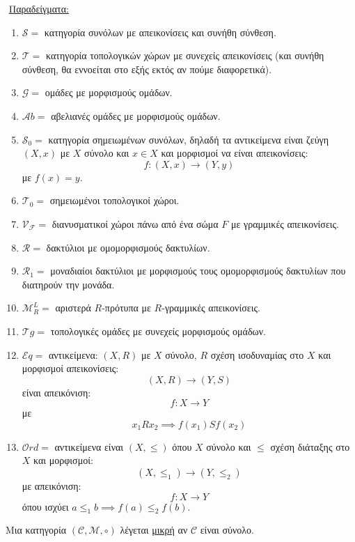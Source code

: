 $ $\newline
\underline{Παραδείγματα:}
\begin{enumerate}
    \item $\mathcal{S} =$ κατηγορία συνόλων με απεικονίσεις και συνήθη σύνθεση.
    \item $ \mathcal{T} = $ κατηγορία τοπολογικών χώρων με συνεχείς απεικονίσεις (και συνήθη σύνθεση, θα εννοείται στο εξής εκτός αν πούμε διαφορετικά).
    \item $\mathcal{G} = $ ομάδες με μορφισμούς ομάδων.
    \item $\mathcal{A}b = $ αβελιανές ομάδες με μορφισμούς ομάδων.
    \item $\mathcal{S}_0 = $ κατηγορία σημειωμένων συνόλων, δηλαδή τα αντικείμενα είναι ζεύγη $(X,x)$ με $X$ σύνολο και $x \in X$ και μορφισμοί να είναι απεικονίσεις:
    $$f:(X,x) \longrightarrow (Y,y)$$ με $f(x) = y$.
    \item $\mathcal{T}_0 = $ σημειωμένοι τοπολογικοί χώροι.
    \item $\mathcal{V_F} = $ διανυσματικοί χώροι πάνω από ένα σώμα $F$ με γραμμικές απεικονίσεις.
    \item $\mathcal{R} = $ δακτύλιοι με ομομορφισμούς δακτυλίων.
    \item $\mathcal{R}_1 = $ μοναδιαίοι δακτύλιοι με μορφισμούς τους ομομορφισμούς δακτυλίων που διατηρούν την μονάδα.
    \item $\mathcal{M}^L_R = $ αριστερά $R$-πρότυπα με $R$-γραμμικές απεικονίσεις.
    \item $\mathcal{T}g = $ τοπολογικές ομάδες με συνεχείς μορφισμούς ομάδων.
    \item $\mathcal{E}q = $ αντικείμενα: $(X,R)$ με $X$ σύνολο, $R$ σχέση ισοδυναμίας στο $X$ και μορφισμοί απεικονίσεις:
    $$ (X,R) \longrightarrow (Y,S)$$ είναι 
    απεικόνιση: $$f: X \rightarrow Y$$ με $$x_1 R x_2 \implies f(x_1) S f(x_2)$$ 
    \item $\mathcal{O}rd = $ αντικείμενα είναι $(X,\leq)$ όπου $X$ σύνολο και $\leq$ σχέση διάταξης στο $X$ και μορφισμοί:
    $$(X,\leq_1) \longrightarrow (Y,\leq_2)$$ με απεικόνιση:
    $$f: X\rightarrow Y$$ όπου ισχύει $a \leq_1 b \implies f(a)\leq_2 f(b)$.


\end{enumerate}

\vspace{0.3truecm}
    
\begin{defn} Μια κατηγορία $(\mathcal{C},\mathcal{M},\circ)$ λέγεται \underline{μικρή} αν $\mathcal{C}$ είναι σύνολο.
\end{defn}

